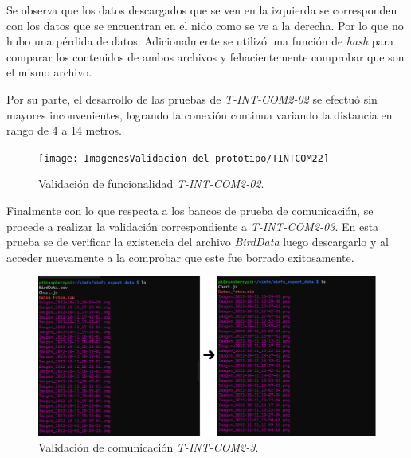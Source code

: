 Se observa que los datos descargados que se ven en la izquierda se corresponden con los datos que se encuentran en el nido como se ve a la derecha. Por lo que no hubo una pérdida de datos.
Adicionalmente se utilizó una función de \textit{hash} para comparar los contenidos de ambos archivos y fehacientemente comprobar que son el mismo archivo. 

Por su parte, el desarrollo de las pruebas de \textit{T-INT-COM2-02} se efectuó sin mayores inconvenientes, logrando la conexión continua variando la distancia en rango de 4 a 14 metros.
\begin{figure}[H]
\centering	\texttt{[image: ImagenesValidacion del prototipo/TINTCOM22]}
	\caption{Validación de funcionalidad \textit{T-INT-COM2-02}.}
\end{figure}

Finalmente con lo que respecta a los bancos de prueba de comunicación, se procede a realizar la validación correspondiente a \textit{T-INT-COM2-03}. En esta prueba se de verificar la existencia del archivo \textit{BirdData} luego descargarlo y al acceder nuevamente a la \rspi comprobar que este fue borrado exitosamente.
\begin{figure}[H]
\centering
	\includegraphics[width=1\linewidth]{ImagenesValidacion del prototipo/TINTCOM23}
	\caption{Validación de comunicación \textit{T-INT-COM2-3}.}
\end{figure}

